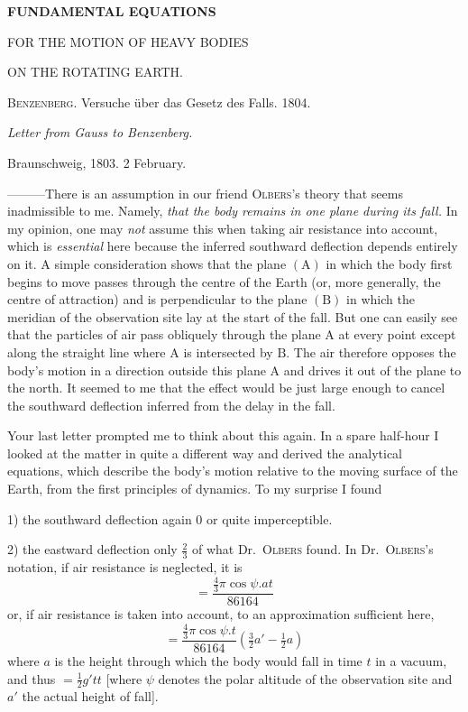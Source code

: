 \begin{center}
{\large\bfseries FUNDAMENTAL EQUATIONS\par\medskip FOR THE MOTION OF HEAVY BODIES\par\medskip ON THE ROTATING EARTH.\par}
\bigskip
\textsc{Benzenberg}. Versuche über das Gesetz des Falls. 1804.
\par\bigskip
{\large\itshape Letter from Gauss to Benzenberg.\par}
\end{center}
\begin{flushright}Braunschweig, 1803. 2 February.\end{flushright}
—\quad—\quad—\quad There is an assumption in our friend \textsc{Olbers}'s theory that seems inadmissible to me. Namely, \textit{that the body remains in one plane during its fall.} In my opinion, one may \textit{not} assume this when taking air resistance into account, which is \textit{essential} here because the inferred southward deflection depends entirely on it. A simple consideration shows that the plane $(\mathrm{A})$ in which the body first begins to move passes through the centre of the Earth (or, more generally, the centre of attraction) and is perpendicular to the plane $(\mathrm{B})$ in which the meridian of the observation site lay at the start of the fall. But one can easily see that the particles of air pass obliquely through the plane $\mathrm{A}$ at every point except along the straight line where $\mathrm{A}$ is intersected by $\mathrm{B}$. The air therefore opposes the body's motion in a direction outside this plane $\mathrm{A}$ and drives it out of the plane to the north. It seemed to me that the effect would be just large enough to cancel the southward deflection inferred from the delay in the fall.

Your last letter prompted me to think about this again. In a spare half-hour I looked at the matter in quite a different way and derived the analytical equations,
which describe the body's motion relative to the moving surface of the Earth, from the first principles of dynamics. To my surprise I found

1) the southward deflection again $0$ or quite imperceptible.

2) the eastward deflection only $\tfrac23$ of what Dr.\ \textsc{Olbers} found. In Dr.\ \textsc{Olbers}'s notation, if air resistance is neglected, it is
\[
=\frac{\tfrac43\pi\cos\psi.at}{86164}
\]
or, if air resistance is taken into account, to an approximation sufficient here,
\[
=\frac{\tfrac43\pi\cos\psi.t}{86164}(\tfrac32a'-\tfrac12a)
\]
where $a$ is the height through which the body would fall in time $t$ in a vacuum, and thus $=\tfrac12g'tt$ [where $\psi$ denotes the polar altitude of the observation site and $a'$ the actual height of fall].

